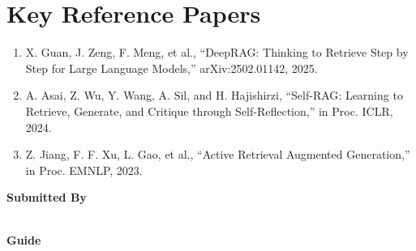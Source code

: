 \documentclass[11pt]{article}
\begin{document}
\section*{Key Reference Papers}
\begin{enumerate}
  \item X. Guan, J. Zeng, F. Meng, et al., ``DeepRAG: Thinking to Retrieve Step by Step for Large Language Models,'' arXiv:2502.01142, 2025.
  \item A. Asai, Z. Wu, Y. Wang, A. Sil, and H. Hajishirzi, ``Self-RAG: Learning to Retrieve, Generate, and Critique through Self-Reflection,'' in Proc. ICLR, 2024.
  \item Z. Jiang, F. F. Xu, L. Gao, et al., ``Active Retrieval Augmented Generation,'' in Proc. EMNLP, 2023.
\end{enumerate}
\vspace{0.8em}
\noindent\textbf{Submitted By}\\
\seminarName\\
\seminarRoll

\vspace{0.6em}
\noindent\textbf{Guide}\\
\seminarGuide
\end{document}
